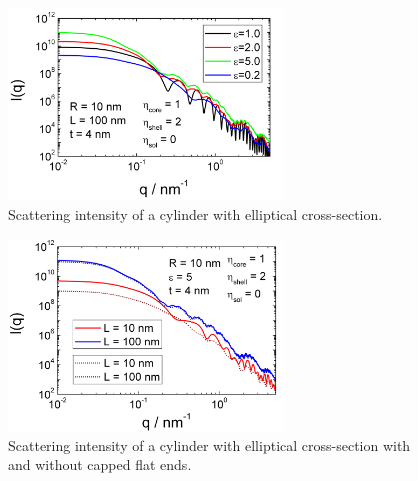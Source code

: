 \begin{figure}[htb]
\begin{center}
\includegraphics[width=0.65\textwidth]{../images/form_factor/cylindrical_obj/ellCylShell1.png}
\end{center}
\caption{Scattering intensity of a cylinder with elliptical cross-section.}
\label{fig:ellCylShell1}
\end{figure}

\begin{figure}[htb]
\begin{center}
\includegraphics[width=0.65\textwidth]{../images/form_factor/cylindrical_obj/ellCylShell1_2.png}
\end{center}
\caption{Scattering intensity of a cylinder with elliptical cross-section with and without capped flat ends.}
\label{fig:ellCylShell1_2}
\end{figure}

\vspace{5mm}

